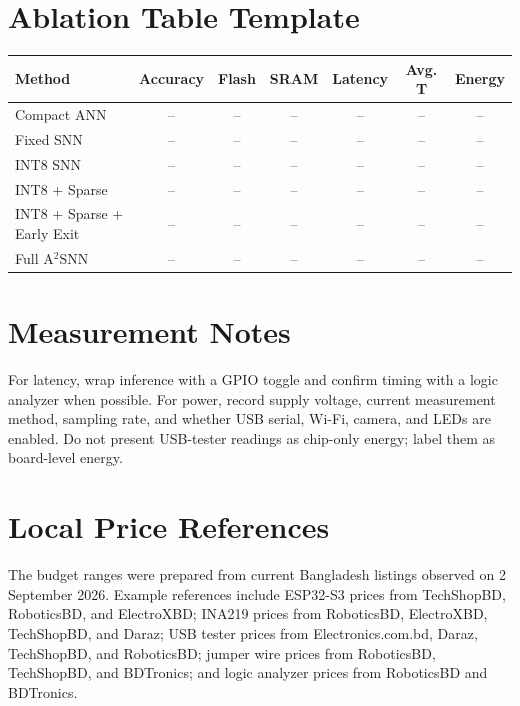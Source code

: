 \documentclass[11pt]{article}
\begin{document}
\section*{Ablation Table Template}
\begin{tabular}{lcccccc}
\toprule
Method & Accuracy & Flash & SRAM & Latency & Avg. T & Energy \\
\midrule
Compact ANN & -- & -- & -- & -- & -- & -- \\
Fixed SNN & -- & -- & -- & -- & -- & -- \\
INT8 SNN & -- & -- & -- & -- & -- & -- \\
INT8 + Sparse & -- & -- & -- & -- & -- & -- \\
INT8 + Sparse + Early Exit & -- & -- & -- & -- & -- & -- \\
Full A$^2$SNN & -- & -- & -- & -- & -- & -- \\
\bottomrule
\end{tabular}

\section*{Measurement Notes}
For latency, wrap inference with a GPIO toggle and confirm timing with a logic analyzer when possible. For power, record supply voltage, current measurement method, sampling rate, and whether USB serial, Wi-Fi, camera, and LEDs are enabled. Do not present USB-tester readings as chip-only energy; label them as board-level energy.

\section*{Local Price References}
The budget ranges were prepared from current Bangladesh listings observed on 2 September 2026. Example references include ESP32-S3 prices from TechShopBD, RoboticsBD, and ElectroXBD; INA219 prices from RoboticsBD, ElectroXBD, TechShopBD, and Daraz; USB tester prices from Electronics.com.bd, Daraz, TechShopBD, and RoboticsBD; jumper wire prices from RoboticsBD, TechShopBD, and BDTronics; and logic analyzer prices from RoboticsBD and BDTronics.
\end{document}
